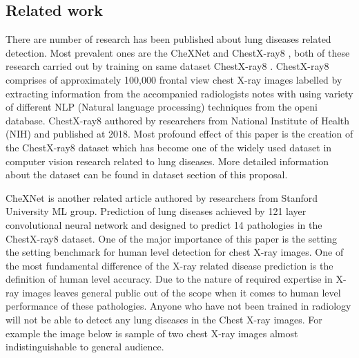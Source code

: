 \documentclass[12pt, twoside, a4paper]{article}
\begin{document}
\subsection{Related work}

There are number of research has been published about lung diseases related detection. Most prevalent ones are the CheXNet \cite{CheXNetRP} and ChestX-ray8 \cite{ChestX-ray8}, both of these research carried out by training on same dataset ChestX-ray8 \cite{ChestX-ray8}. ChestX-ray8 comprises of approximately 100,000 frontal view chest X-ray images labelled by extracting information from the accompanied radiologists notes with using variety of different NLP (Natural language processing) techniques from the openi\cite{openi} database. ChestX-ray8 authored by researchers from National Institute of Health (NIH) and published at 2018.
Most profound effect of this paper is the creation of the ChestX-ray8 dataset which has become one of the widely used dataset in computer vision research related to lung diseases. More detailed information about the dataset can be found in dataset section of this proposal. 

CheXNet is another related article authored by researchers from Stanford University ML group. Prediction of lung diseases achieved by 121 layer convolutional neural network and designed to predict 14 pathologies in the ChestX-ray8 dataset. One of the major importance of this paper is the setting the setting benchmark for human level detection for chest X-ray images. One of the most fundamental difference of the X-ray related disease prediction is the definition of human level accuracy. Due to the nature of required expertise in X-ray images leaves general public out of the scope when it comes to human level performance of these pathologies. Anyone who have not been trained in radiology will not be able to detect any lung diseases in the Chest X-ray images. For example the image below is sample of two chest X-ray images almost indistinguishable to general audience.
\end{document}

